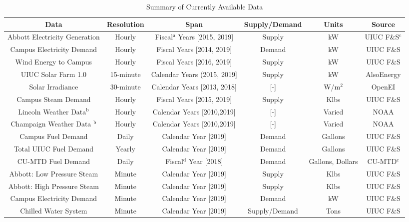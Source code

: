 \begin{landscape}

  \begin{table}
    \centering
    \caption{Summary of Currently Available Data}
    \label{tab:datasummary}
    \begin{tabular}{c|c|c|c|c|c}
      \hline
      Data & Resolution & Span & Supply/Demand & Units & Source\\
      \hline
      Abbott Electricity Generation & Hourly & Fiscal$^{\text{a}}$ Years [2015, 2019]& Supply & kW & UIUC F\&S$^{\text{c}}$\\
      Campus Electricity Demand & Hourly & Fiscal Years [2014, 2019] & Demand & kW & UIUC F\&S \\
      Wind Energy to Campus & Hourly & Fiscal Years [2016, 2019] & Supply & kW & UIUC F\&S \\
      UIUC Solar Farm 1.0 & 15-minute & Calendar Years (2015, 2019] & Supply & kW & AlsoEnergy \cite{alsoenergy_university_2019}\\
      Solar Irradiance & 30-minute & Calendar Years [2013, 2018]& [-] & W/m$^2$& OpenEI \cite{sengupta_national_2018}\\
      Campus Steam Demand & Hourly & Fiscal Years [2015, 2019] & Supply & Klbs & UIUC F\&S\\
      Lincoln Weather Data$^{\text{b}}$ & Hourly & Calendar Years [2010,2019] & [-] & Varied & NOAA \cite{noauthor_climate_nodate} \\
      Champaign Weather Data $^{\text{b}}$& Hourly & Calendar Years [2010,2019]& [-] & Varied & NOAA \cite{noauthor_climate_nodate}\\
      Campus Fuel Demand & Daily & Calendar Year [2019]& Demand & Gallons & UIUC F\&S \\
      Total UIUC Fuel Demand & Yearly & Calendar Year [2019]& Demand & Gallons & UIUC F\&S \\
      CU-MTD Fuel Demand & Daily & Fiscal$^{\text{d}}$ Year [2018]& Demand & Gallons, Dollars & CU-MTD$^{\text{c}}$ \\
      Abbott: Low Pressure Steam & Minute & Calendar Year [2019] & Supply & Klbs & UIUC F\&S\\
      Abbott: High Pressure Steam & Minute & Calendar Year [2019] & Supply & Klbs & UIUC F\&S\\
      Campus Electricity Demand & Minute & Calendar Year [2019] & Demand & kW & UIUC F\&S\\
      Chilled Water System & Minute & Calendar Year [2019] & Supply/Demand & Tons & UIUC F\&S\\

\end{tabular}
\end{table}
\end{landscape}
